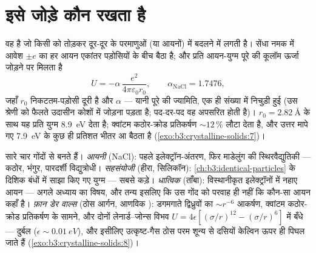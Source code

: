 \section{इसे जोड़े कौन रखता है}

\begin{proposition}[आयनी संसंजन: माडेलुंग योग]\label{prop:b3:crystalline-solids:madelung}
\emph{} वह है जो किसी  को तोड़कर दूर-दूर के
परमाणुओं (या आयनों) में बदलने में लगती है। सेंधा नमक में आवेश
$\pm e$ का हर आयन एकांतर पड़ोसियों के बीच बैठा है; और प्रति आयन-युग्म
पूरे  की कूलॉम ऊर्जा जोड़ने पर मिलता है
\[
U = -\alpha\,\frac{e^2}{4\pi\varepsilon_0 r_0} ,
\qquad \alpha_{\text{NaCl}} = 1.7476 ,
\]
जहाँ $r_0$ निकटतम-पड़ोसी दूरी है और $\alpha$
\emph{} --- यानी पूरे  की ज्यामिति,
एक ही संख्या में निचुड़ी हुई (उस श्रेणी को फैलते उदासीन कोशों में
जोड़ना पड़ता है; पद-दर-पद वह अपसरित होती है)। $r_0 =
\qty{2.82}{\angstrom}$ के साथ यह प्रति युग्म \qty{8.9}{eV} देता है;
क्वांटम कठोर-क्रोड प्रतिकर्षण $\sim12\,\%$ लौटा देता है, और उत्तर
मापे गए \qty{7.9}{eV} के कुछ ही प्रतिशत भीतर आ बैठता है
(\cref{exo:b3:crystalline-solids:7})।
\end{proposition}
\admitted

\begin{remark}[बंधों की चौकड़ी]\label{rem:b3:crystalline-solids:bonds}
सारे  चार गोंदों से बनते हैं। \emph{आयनी} (NaCl): पहले
इलेक्ट्रॉन-अंतरण, फिर माडेलुंग की स्थिरवैद्युतिकी --- कठोर, भंगुर,
पारदर्शी विद्युत्रोधी। \emph{सहसंयोजी} (हीरा, सिलिकॉन):
\cref{ch:b3:identical-particles} के दिशिक बंधों में साझा किए गए
युग्म --- सबसे कड़े।
\emph{धात्विक} (ताँबा): विस्थानीकृत इलेक्ट्रॉनों में नहाए आयन ---
अगले अध्याय का विषय, और तन्य इसलिए कि उस गोंद को परवाह ही नहीं कि
कौन-सा आयन कहाँ है। \emph{फ़ान डेर वाल्स} (ठोस आर्गन, आणविक
): डगमगाते द्विध्रुवों का $\sim r^{-6}$ आकर्षण, क्वांटम
कठोर-क्रोड प्रतिकर्षण के सामने, और दोनों लेनार्ड--जोन्स विभव
$U = 4\epsilon[(\sigma/r)^{12} - (\sigma/r)^6]$ में बँधे --- दुर्बल
($\epsilon \sim \qty{0.01}{eV}$), और इसीलिए उत्कृष्ट-गैस ठोस परम
शून्य से दसियों केल्विन ऊपर ही पिघल जाते हैं
(\cref{exo:b3:crystalline-solids:8})।
\end{remark}

